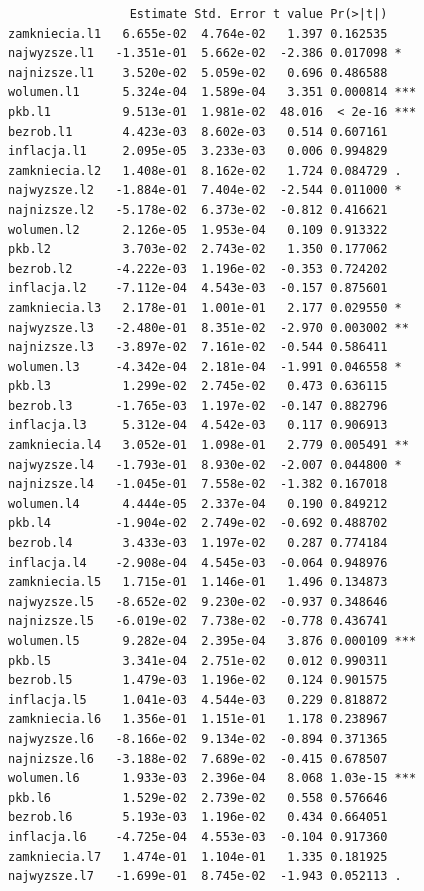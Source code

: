 \documentclass[
  polish,
  letterpaper,
  DIV=11,
  numbers=noendperiod]{scrartcl}
\begin{document}
\begin{verbatim}
                 Estimate Std. Error t value Pr(>|t|)    
zamkniecia.l1   6.655e-02  4.764e-02   1.397 0.162535    
najwyzsze.l1   -1.351e-01  5.662e-02  -2.386 0.017098 *  
najnizsze.l1    3.520e-02  5.059e-02   0.696 0.486588    
wolumen.l1      5.324e-04  1.589e-04   3.351 0.000814 ***
pkb.l1          9.513e-01  1.981e-02  48.016  < 2e-16 ***
bezrob.l1       4.423e-03  8.602e-03   0.514 0.607161    
inflacja.l1     2.095e-05  3.233e-03   0.006 0.994829    
zamkniecia.l2   1.408e-01  8.162e-02   1.724 0.084729 .  
najwyzsze.l2   -1.884e-01  7.404e-02  -2.544 0.011000 *  
najnizsze.l2   -5.178e-02  6.373e-02  -0.812 0.416621    
wolumen.l2      2.126e-05  1.953e-04   0.109 0.913322    
pkb.l2          3.703e-02  2.743e-02   1.350 0.177062    
bezrob.l2      -4.222e-03  1.196e-02  -0.353 0.724202    
inflacja.l2    -7.112e-04  4.543e-03  -0.157 0.875601    
zamkniecia.l3   2.178e-01  1.001e-01   2.177 0.029550 *  
najwyzsze.l3   -2.480e-01  8.351e-02  -2.970 0.003002 ** 
najnizsze.l3   -3.897e-02  7.161e-02  -0.544 0.586411    
wolumen.l3     -4.342e-04  2.181e-04  -1.991 0.046558 *  
pkb.l3          1.299e-02  2.745e-02   0.473 0.636115    
bezrob.l3      -1.765e-03  1.197e-02  -0.147 0.882796    
inflacja.l3     5.312e-04  4.542e-03   0.117 0.906913    
zamkniecia.l4   3.052e-01  1.098e-01   2.779 0.005491 ** 
najwyzsze.l4   -1.793e-01  8.930e-02  -2.007 0.044800 *  
najnizsze.l4   -1.045e-01  7.558e-02  -1.382 0.167018    
wolumen.l4      4.444e-05  2.337e-04   0.190 0.849212    
pkb.l4         -1.904e-02  2.749e-02  -0.692 0.488702    
bezrob.l4       3.433e-03  1.197e-02   0.287 0.774184    
inflacja.l4    -2.908e-04  4.545e-03  -0.064 0.948976    
zamkniecia.l5   1.715e-01  1.146e-01   1.496 0.134873    
najwyzsze.l5   -8.652e-02  9.230e-02  -0.937 0.348646    
najnizsze.l5   -6.019e-02  7.738e-02  -0.778 0.436741    
wolumen.l5      9.282e-04  2.395e-04   3.876 0.000109 ***
pkb.l5          3.341e-04  2.751e-02   0.012 0.990311    
bezrob.l5       1.479e-03  1.196e-02   0.124 0.901575    
inflacja.l5     1.041e-03  4.544e-03   0.229 0.818872    
zamkniecia.l6   1.356e-01  1.151e-01   1.178 0.238967    
najwyzsze.l6   -8.166e-02  9.134e-02  -0.894 0.371365    
najnizsze.l6   -3.188e-02  7.689e-02  -0.415 0.678507    
wolumen.l6      1.933e-03  2.396e-04   8.068 1.03e-15 ***
pkb.l6          1.529e-02  2.739e-02   0.558 0.576646    
bezrob.l6       5.193e-03  1.196e-02   0.434 0.664051    
inflacja.l6    -4.725e-04  4.553e-03  -0.104 0.917360    
zamkniecia.l7   1.474e-01  1.104e-01   1.335 0.181925    
najwyzsze.l7   -1.699e-01  8.745e-02  -1.943 0.052113 .  

\end{verbatim}
\end{document}
